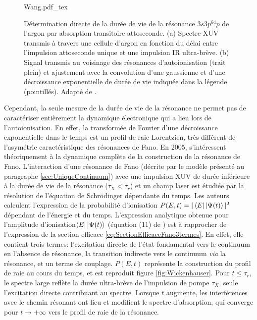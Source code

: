 \begin{figure}
\centering
\def\svgwidth{0.9\textwidth}
{Wang.pdf_tex}
\caption{Détermination directe de la durée de vie de la résonance $3s3p^64p$ de l'argon par absorption transitoire attoseconde. (a) Spectre XUV transmis à travers une cellule d'argon en fonction du délai entre l'impulsion attoseconde unique et une impulsion IR ultra-brève. (b) Signal transmis au voisinage des résonances d'autoionisation (trait plein) et ajustement avec la convolution d'une gaussienne et d'une décroissance exponentielle de durée de vie indiquée dans la légende (pointillés). Adapté de .}
\label{fig:Wang}
\end{figure}

Cependant, la seule mesure de la durée de vie de la résonance ne permet pas de caractériser entièrement la dynamique électronique qui a lieu lors de l'autoionisation. En effet, la transformée de Fourier d'une décroissance exponentielle dans le temps est un profil de raie Lorentzien, très différent de l'asymétrie caractéristique des résonances de Fano. En 2005,  s'intéressent théoriquement à la dynamique complète de la construction de la résonance de Fano. L'interaction d'une résonance de Fano (décrite par le modèle présenté au paragraphe \ref{sec:UniqueContinuum}) avec une impulsion XUV de durée inférieure à la durée de vie de la résonance ($\tau_X < \tau_r$) et un champ laser est étudiée par la résolution de l'équation de Schrödinger dépendante du temps. Les auteurs calculent l'expression de la probabilité d'ionisation $P(E, t) = |\bra{E}\ket{\Psi (t)}|^2$ dépendant de l'énergie et du temps. L'expression analytique obtenue pour l'amplitude d'ionisation$\bra{E}\ket{\Psi (t)}$ (équation (11) de ) est à rapprocher de l'expression de la section efficace \ref{eq:SectionEfficaceFano3termes}. En effet, elle contient trois termes: l'excitation directe de l'état fondamental vers le continuum en l'absence de résonance, la transition indirecte vers le continuum \textit{via} la résonance, et un terme de couplage. $P(E, t)$ représente la construction du profil de raie au cours du temps, et est reproduit figure \ref{fig:Wickenhauser}. Pour $t \leq \tau_r$, le spectre large reflète la durée ultra-brève de l'impulsion de pompe $\tau_X$, seule l'excitation directe contribuant au spectre. Lorsque $t$ augmente, les interférences avec le chemin résonant ont lieu et modifient le spectre d'absorption, qui converge pour $t \rightarrow + \infty$ vers le profil de raie de la résonance. 

